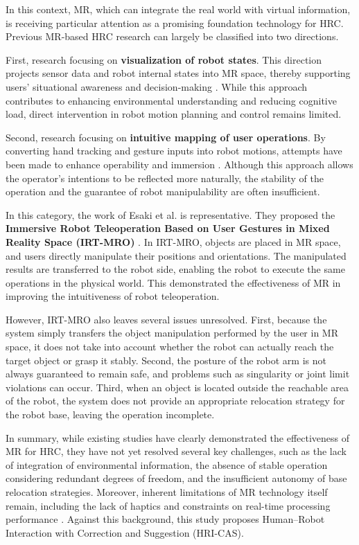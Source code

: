 \documentclass[../../main.tex]{subfiles} %
\begin{document}
\medskip
\noindent
In this context, MR, which can integrate the real world with virtual information, 
is receiving particular attention as a promising foundation technology for HRC.
Previous MR-based HRC research can largely be classified into two directions.


\medskip
\noindent
First, research focusing on \textbf{visualization of robot states}.  
This direction projects sensor data and robot internal states into MR space, 
thereby supporting users’ situational awareness and decision-making \cite{Awareness}.  
While this approach contributes to enhancing environmental understanding and reducing cognitive load, 
direct intervention in robot motion planning and control remains limited.


\medskip
\noindent
Second, research focusing on \textbf{intuitive mapping of user operations}.  
By converting hand tracking and gesture inputs into robot motions, 
attempts have been made to enhance operability and immersion \cite{MR1}\cite{MR2}\cite{MR3}\cite{MR4}\cite{MR5}. 
Although this approach allows the operator’s intentions to be reflected more naturally, 
the stability of the operation and the guarantee of robot manipulability are often insufficient.

\medskip
\noindent
In this category, the work of Esaki et al. is representative.  
They proposed the \textbf{Immersive Robot Teleoperation Based on User Gestures in Mixed Reality Space (IRT-MRO)} \cite{Esaki}.  
In IRT-MRO, objects are placed in MR space, and users directly manipulate their positions and orientations.  
The manipulated results are transferred to the robot side, enabling the robot to 
execute the same operations in the physical world.  
This demonstrated the effectiveness of MR in improving the intuitiveness of robot teleoperation.  

However, IRT-MRO also leaves several issues unresolved.  
First, because the system simply transfers the object manipulation performed by the user in MR space, 
it does not take into account whether the robot can actually reach the target object or grasp it stably.  
Second, the posture of the robot arm is not always guaranteed to remain safe, 
and problems such as singularity or joint limit violations can occur.  
Third, when an object is located outside the reachable area of the robot, 
the system does not provide an appropriate relocation strategy for the robot base, 
leaving the operation incomplete.  

\medskip
\noindent
In summary, while existing studies have clearly demonstrated the effectiveness of MR for HRC, 
they have not yet resolved several key challenges, such as the lack of integration of environmental information, 
the absence of stable operation considering redundant degrees of freedom, and the insufficient autonomy of base relocation strategies. 
Moreover, inherent limitations of MR technology itself remain, including the lack of haptics and constraints on real-time processing 
performance \cite{LimitMR}. Against this background, this study proposes 
Human–Robot Interaction with Correction and Suggestion (HRI-CAS).  
\end{document}
